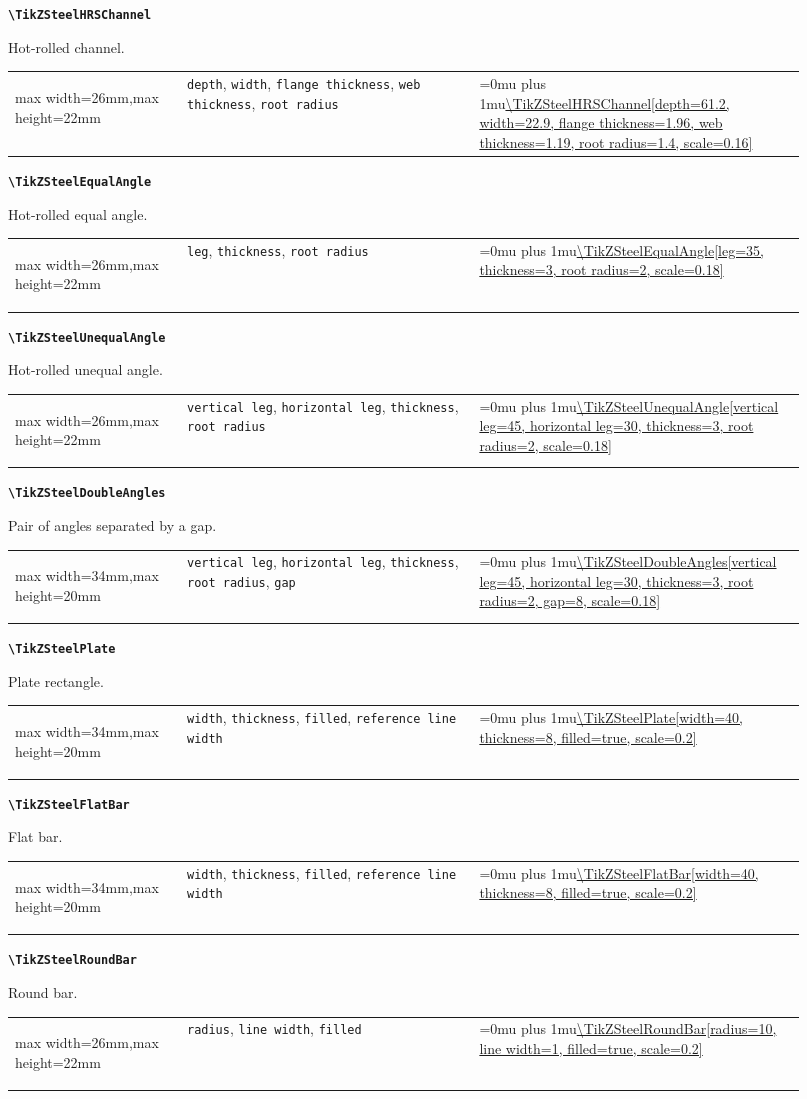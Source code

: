 \documentclass[10pt]{article}
\makeatletter
\newcommand{\command}[1]{\texttt{\textbackslash #1}}
\newcommand{\keyname}[1]{\texttt{#1}}
\newcommand{\CodeInline}[1]{%
  \begingroup
  \ttfamily\scriptsize\raggedright\Urlmuskip=0mu plus 1mu\url{#1}%
  \endgroup
}
\newcommand{\ShapePreview}[1]{%
  \begin{center}
  \begin{adjustbox}{max width=26mm,max height=22mm}
    \begin{tikzpicture}
      #1
    \end{tikzpicture}
  \end{adjustbox}
  \end{center}
}
\newcommand{\WideShapePreview}[1]{%
  \begin{center}
  \begin{adjustbox}{max width=34mm,max height=20mm}
    \begin{tikzpicture}
      #1
    \end{tikzpicture}
  \end{adjustbox}
  \end{center}
}
\newcommand{\ReferenceRow}[6]{%
  \textbf{\command{#1}}\par
  #2\par
  \vspace{2pt}
  \begin{tabular}{@{}p{0.20\linewidth}p{0.34\linewidth}p{0.38\linewidth}@{}}
    #6 & \footnotesize #3 & \CodeInline{#4}
  \end{tabular}
  \par\vspace{4mm}
}
\makeatother
\begin{document}
\ReferenceRow
  {TikZSteelHRSChannel}
  {Hot-rolled channel.}
  {\keyname{depth}, \keyname{width}, \keyname{flange thickness}, \keyname{web thickness}, \keyname{root radius}}
  {\TikZSteelHRSChannel[depth=61.2, width=22.9, flange thickness=1.96, web thickness=1.19, root radius=1.4, scale=0.16]}
  {}
  {\ShapePreview{\TikZSteelHRSChannel[depth=61.2, width=22.9, flange thickness=1.96, web thickness=1.19, root radius=1.4, scale=0.16]}}

\ReferenceRow
  {TikZSteelEqualAngle}
  {Hot-rolled equal angle.}
  {\keyname{leg}, \keyname{thickness}, \keyname{root radius}}
  {\TikZSteelEqualAngle[leg=35, thickness=3, root radius=2, scale=0.18]}
  {}
  {\ShapePreview{\TikZSteelEqualAngle[leg=35, thickness=3, root radius=2, scale=0.18]}}

\ReferenceRow
  {TikZSteelUnequalAngle}
  {Hot-rolled unequal angle.}
  {\keyname{vertical leg}, \keyname{horizontal leg}, \keyname{thickness}, \keyname{root radius}}
  {\TikZSteelUnequalAngle[vertical leg=45, horizontal leg=30, thickness=3, root radius=2, scale=0.18]}
  {}
  {\ShapePreview{\TikZSteelUnequalAngle[vertical leg=45, horizontal leg=30, thickness=3, root radius=2, scale=0.18]}}

\ReferenceRow
  {TikZSteelDoubleAngles}
  {Pair of angles separated by a gap.}
  {\keyname{vertical leg}, \keyname{horizontal leg}, \keyname{thickness}, \keyname{root radius}, \keyname{gap}}
  {\TikZSteelDoubleAngles[vertical leg=45, horizontal leg=30, thickness=3, root radius=2, gap=8, scale=0.18]}
  {}
  {\WideShapePreview{\TikZSteelDoubleAngles[vertical leg=45, horizontal leg=30, thickness=3, root radius=2, gap=8, scale=0.18]}}

\ReferenceRow
  {TikZSteelPlate}
  {Plate rectangle.}
  {\keyname{width}, \keyname{thickness}, \keyname{filled}, \keyname{reference line width}}
  {\TikZSteelPlate[width=40, thickness=8, filled=true, scale=0.2]}
  {}
  {\WideShapePreview{\TikZSteelPlate[width=40, thickness=8, filled=true, scale=0.2]}}

\ReferenceRow
  {TikZSteelFlatBar}
  {Flat bar.}
  {\keyname{width}, \keyname{thickness}, \keyname{filled}, \keyname{reference line width}}
  {\TikZSteelFlatBar[width=40, thickness=8, filled=true, scale=0.2]}
  {}
  {\WideShapePreview{\TikZSteelFlatBar[width=40, thickness=8, filled=true, scale=0.2]}}

\ReferenceRow
  {TikZSteelRoundBar}
  {Round bar.}
  {\keyname{radius}, \keyname{line width}, \keyname{filled}}
  {\TikZSteelRoundBar[radius=10, line width=1, filled=true, scale=0.2]}
  {}
  {\ShapePreview{\TikZSteelRoundBar[radius=10, line width=1, filled=true, scale=0.2]}}
\end{document}
